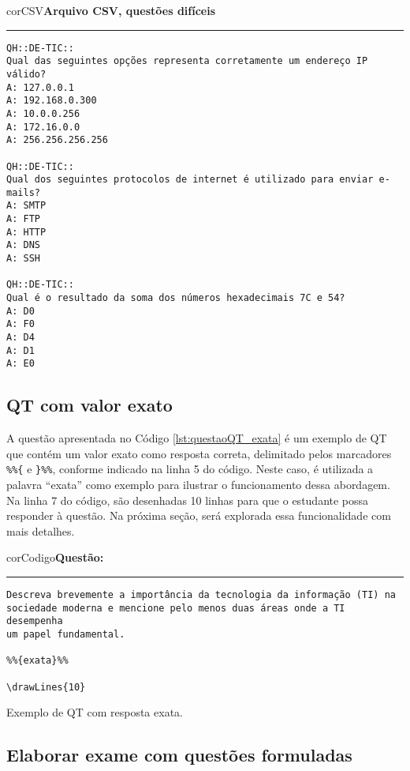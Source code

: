 \begin{myboxCode}{corCSV}{\textbf{Arquivo CSV, questões difíceis}}\vspace{3mm}
\hrule
{\footnotesize
\begin{verbatim}
QH::DE-TIC:: 
Qual das seguintes opções representa corretamente um endereço IP válido?
A: 127.0.0.1
A: 192.168.0.300
A: 10.0.0.256
A: 172.16.0.0
A: 256.256.256.256

QH::DE-TIC::
Qual dos seguintes protocolos de internet é utilizado para enviar e-mails?
A: SMTP
A: FTP
A: HTTP
A: DNS
A: SSH

QH::DE-TIC::
Qual é o resultado da soma dos números hexadecimais 7C e 54?
A: D0
A: F0
A: D4
A: D1
A: E0
\end{verbatim}
}
\end{myboxCode}

\subsection{QT com valor exato}\label{sec:QT_exato}

A questão apresentada no Código \ref{lst:questaoQT_exata} é um exemplo de QT que contém um valor exato como resposta correta, delimitado pelos marcadores \verb|%%{| e \verb|}%%|, conforme indicado na linha 5 do código. Neste caso, é utilizada a palavra ``exata'' como exemplo para ilustrar o funcionamento dessa abordagem. Na linha 7 do código, são desenhadas 10 linhas para que o estudante possa responder à questão. Na próxima seção, será explorada essa funcionalidade com mais detalhes.

\begin{listing}[!ht]
\begin{myboxCode}{corCodigo}{\textbf{Questão: }}\vspace{3mm}
\hrule
\begin{verbatim}
Descreva brevemente a importância da tecnologia da informação (TI) na 
sociedade moderna e mencione pelo menos duas áreas onde a TI desempenha 
um papel fundamental.

%%{exata}%%

\drawLines{10}
\end{verbatim}
\end{myboxCode}
\caption{Exemplo de QT com resposta exata.}
\label{lst:questaoQT_exata}
\end{listing}

\subsection{Elaborar exame com questões formuladas}\label{sec:cap8_criar_exame}

